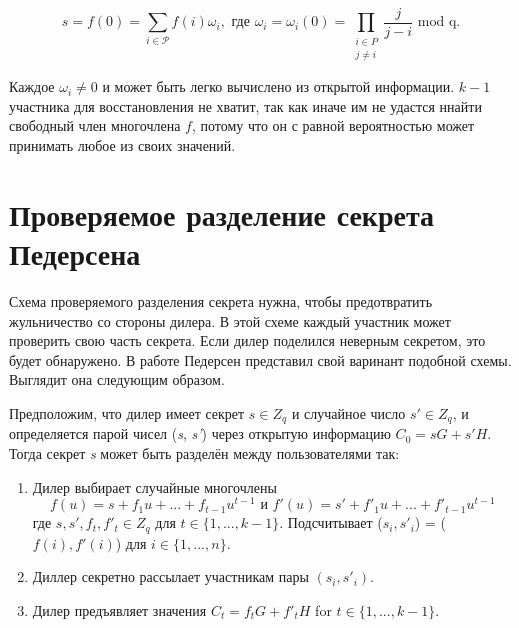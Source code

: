 $$ s = f(0) = \sum_{i\in\mathcal{P}}f(i)\omega_i, \text{ где } \omega_i = \omega_i(0) = \prod_{\substack{i \in P \\ j \neq i}} \frac{j}{j - i} \text{ mod q.}$$

Каждое $\omega_i \neq 0$ и может быть легко вычислено из открытой информации. $k - 1$ участника для восстановления не хватит, так как иначе им не удастся ннайти свободный член многочлена $f$, потому что он с равной вероятностью может принимать любое из своих значений.

\section{Проверяемое разделение секрета Педерсена}

Схема проверяемого разделения секрета нужна, чтобы предотвратить жульничество со стороны дилера. В этой схеме каждый участник может проверить свою часть секрета. Если дилер поделился неверным секретом, это будет обнаружено. В работе \cite{VSS} Педерсен представил свой варинант подобной схемы. Выглядит она следующим образом.

Предположим, что дилер имеет секрет $s \in Z_q$ и случайное число $s' \in Z_q$, и определяется парой чисел (\textit{s}, \textit{s'}) через открытую информацию $C_0 = sG + s'H.$ Тогда секрет \textit{s} может быть разделён между пользователями так:

\begin{enumerate}
    \item Дилер выбирает случайные многочлены
    $$ f(u) = s + f_1u + ...+f_{t-1}u^{t-1} \text{ и } f'(u) = s' + f'_1u + ... + f'_{t-1}u^{t-1}$$
    где $s, s', f_t, f'_t \in Z_q$ для $t \in \{1, ... , k-1\}$. Подсчитывает ($s_i, s'_i$) = ($f(i), f'(i)$) для $i \in \{1, ..., n\}$.

    \item Диллер секретно рассылает участникам пары $(s_i, s'_i)$.

    \item Дилер предъявляет значения $C_t = f_tG + f'_tH$ for $t \in \{1, ..., k-1\}$.
\end{enumerate}

